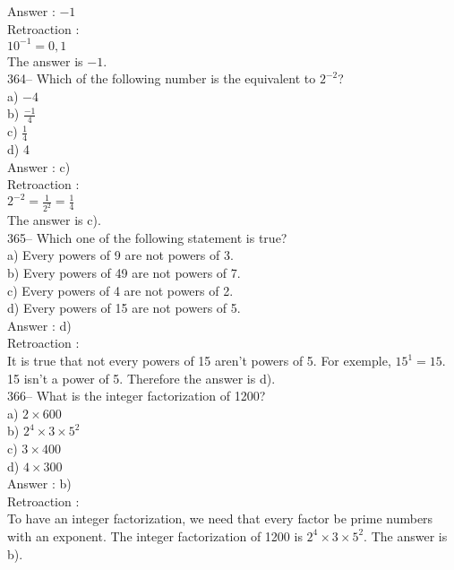 ﻿\documentclass[letterpaper, 12pt]{article}
\begin{document}
Answer : $-1$\\

Retroaction : \\
$10^{-1}=0,1$\\
The answer is $-1$.\\

364-- Which of the following number is the equivalent to $2^{-2}$?\\
a) $-4$\\[2mm]
b) $\frac{-1}{4}$\\[2mm]
c) $\frac{1}{4}$\\[2mm]
d) 4\\

Answer : c)\\

Retroaction : \\
$2^{-2}=\frac{1}{2^{2}}=\frac{1}{4}$\\[2mm]
The answer is c).\\

365-- Which one of the following statement is true?\\
a) Every powers of 9 are not powers of 3.\\
b) Every powers of 49 are not powers of 7.\\
c) Every powers of 4 are not powers of 2.\\
d) Every powers of 15 are not powers of 5.\\

Answer : d)\\

Retroaction : \\
It is true that not every powers of 15 aren't powers of 5.
  For exemple, $15^{1}=15$. 15 isn't a power of 5.  Therefore the answer is d).\\

366-- What is the integer factorization of 1200?\\
a) $2\times600$\\
b) $2^{4}\times3\times5^{2}$\\
c) $3\times 400$\\
d) $4\times300$\\

Answer : b)\\

Retroaction : \\
To have an integer factorization, we need that every factor be prime numbers with an exponent. The integer factorization of 1200 is $2^{4}\times3\times5^{2}$.  The answer is b).\\
\end{document}
